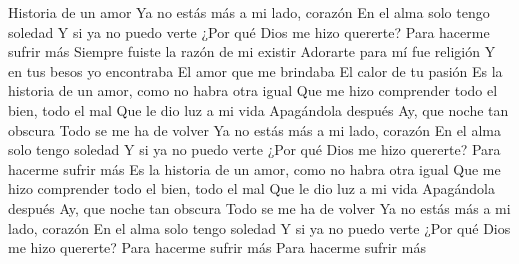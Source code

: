 Historia de un amor
Ya no estás más a mi lado, corazón
En el alma solo tengo soledad
Y si ya no puedo verte
¿Por qué Dios me hizo quererte?
Para hacerme sufrir más
Siempre fuiste la razón de mi existir
Adorarte para mí fue religión
Y en tus besos yo encontraba
El amor que me brindaba
El calor de tu pasión
Es la historia de un amor, como no habra otra igual
Que me hizo comprender todo el bien, todo el mal
Que le dio luz a mi vida
Apagándola después
Ay, que noche tan obscura
Todo se me ha de volver
Ya no estás más a mi lado, corazón
En el alma solo tengo soledad
Y si ya no puedo verte
¿Por qué Dios me hizo quererte?
Para hacerme sufrir más
Es la historia de un amor, como no habra otra igual
Que me hizo comprender todo el bien, todo el mal
Que le dio luz a mi vida
Apagándola después
Ay, que noche tan obscura
Todo se me ha de volver
Ya no estás más a mi lado, corazón
En el alma solo tengo soledad
Y si ya no puedo verte
¿Por qué Dios me hizo quererte?
Para hacerme sufrir más
Para hacerme sufrir más